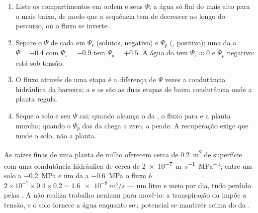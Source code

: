 \begin{method}\label{met:b1:plant-water-minerals:profile}
\begin{enumerate}
  \item Liste os compartimentos em ordem e seus $\Psi$; a água só flui
        do mais alto para o mais baixo, de modo que a sequência tem de
        decrescer ao longo do percurso, ou o fluxo se inverte.
  \item Separe o $\Psi$ de cada  em $\Psi_s$ (solutos, negativo)
        e $\Psi_p$ (, positivo); uma  da  a
        $\Psi = -0.4$ com $\Psi_s = -0.9$ tem $\Psi_p = +0.5$. A água
        do  tem $\Psi_s \approx 0$ e $\Psi_p$ negativo: está sob
        tensão.
  \item O fluxo através de uma etapa é a diferença de $\Psi$ vezes a
        condutância hidráulica da barreira; a  e os 
        são as duas etapas de baixa condutância onde a planta regula.
  \item Seque o solo e seu $\Psi$ cai; quando alcança o da , o
        fluxo para e a planta murcha; quando o $\Psi_p$ das  da
         chega a zero, a  pende. A recuperação exige que
        mude o solo, não a planta.
\end{enumerate}
\end{method}

\begin{example}\label{ex:b1:plant-water-minerals:litre}
As raízes finas de uma planta de milho oferecem cerca de
\qty{0.2}{m^2} de superfície com uma condutância hidráulica de cerca
de \qty{2e-7}{m.s^{-1}.MPa^{-1}}; entre um solo a \qty{-0.2}{MPa} e um
 da  a \qty{-0.6}{MPa} o fluxo é
$2\times 10^{-7}\times 0.4\times 0.2 = \qty{1.6e-8}{m^3/s}$ --- um
litro e meio por dia, tudo perdido pelas . A  não realiza
trabalho nenhum para movê-lo: a transpiração da  impõe a tensão,
e o solo fornece a água enquanto seu potencial se mantiver acima do da
.
\end{example}

